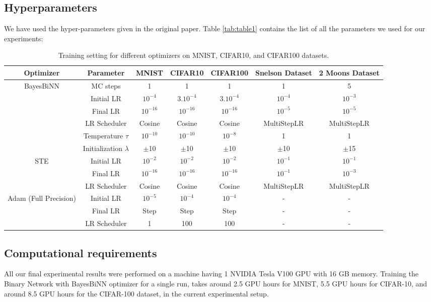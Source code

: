 \subsection{Hyperparameters}
We have used the hyper-parameters given in the original paper. Table \autoref{tab:table1} contains the list of all the parameters we used for our experiments:

\begin{table}[h]
\begin{center}

\footnotesize
\begin{tabular}{ | c | c | c | c | c | c | c | }
\hline
  Optimizer & Parameter & MNIST & CIFAR10 & CIFAR100 & Snelson Dataset & 2 Moons Dataset \\ \hline
  \multirow{6}{5em}{BayesBiNN} & MC steps & 1 & 1 & 1 & 1 & 5 \\
   & Initial LR & $10^{-4}$ & $3.10^{-4}$ & $3.10^{-4}$ & $10^{-4}$ & $10^{-3}$ \\
   & Final LR & $10^{-16}$ & $10^{-16}$ & $10^{-16}$ & $10^{-5}$ & $10^{-5}$ \\
   & LR Scheduler & Cosine & Cosine & Cosine & MultiStepLR & MultiStepLR \\
   & Temperature $\tau$ & $10^{-10}$ & $10^{-10}$ & $10^{-8}$ & 1 & 1 \\
   & Initialization $\lambda$ & $\pm$10 & $\pm$10 & $\pm$10 & $\pm$10 & $\pm$15 \\ \hline
      
  \multirow{3}{5em}{STE} 
   & Initial LR & $10^{-2}$ & $10^{-2}$ & $10^{-2}$ & $10^{-1}$ & $10^{-1}$ \\
   & Final LR & $10^{-16}$ & $10^{-16}$ & $10^{-16}$ & $10^{-1}$ & $10^{-3}$ \\
   & LR Scheduler & Cosine & Cosine & Cosine & MultiStepLR & MultiStepLR \\
\hline
   
  \multirow{3}{5em}{Adam (Full Precision)} 
   & Initial LR & $10^{-5}$ & $10^{-4}$ & $10^{-4}$ & - & - \\
   & Final LR & Step & Step & Step & - & - \\
   & LR Scheduler & 1 & 100 & 100 & - & - \\ \hline

\end{tabular}
\caption{Training setting for different optimizers on MNIST, CIFAR10, and CIFAR100 datasets.}
\label{tab:table1}
\end{center}
\end{table}


\subsection{Computational requirements}
All our final experimental results were performed on a machine having 1 NVIDIA Tesla V100 GPU with 16 GB memory. Training the Binary Network with BayesBiNN optimizer for a single run, takes around 2.5 GPU hours for MNIST, 5.5 GPU hours for CIFAR-10, and around 8.5 GPU hours for the CIFAR-100 dataset, in the current experimental setup.